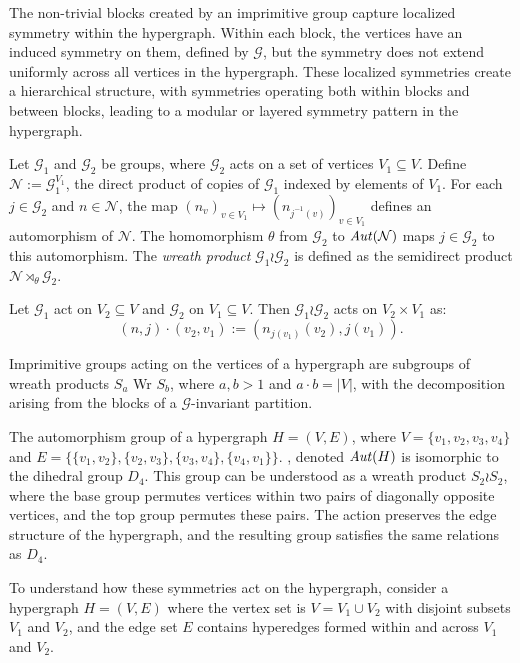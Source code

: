The non-trivial blocks created by an imprimitive group capture localized symmetry within the hypergraph. Within each block, the vertices have an induced symmetry on them, defined by $\mathcal{G}$, but the symmetry does not extend uniformly across all vertices in the hypergraph. These localized symmetries create a hierarchical structure, with symmetries operating both within blocks and between blocks, leading to a modular or layered symmetry pattern in the hypergraph. \cite{BCW24}

\begin{definition}
Let $\mathcal{G}_1$ and $\mathcal{G}_2$ be groups, where $\mathcal{G}_2$ acts on a set of vertices $V_1\subseteq V$. Define $\mathcal{N}:=\mathcal{G}_1^{V_1}$, the direct product of copies of $\mathcal{G}_1$ indexed by elements of $V_1$. For each $j\in\mathcal{G}_2$ and $n\in\mathcal{N}$, the map $(n_v)_{v\in V_1}\mapsto(n_{j^{-1}(v)})_{v\in V_1}$ defines an automorphism of $\mathcal{N}$. The homomorphism $\theta$ from $\mathcal{G}_2$ to $\mathit{Aut}(\mathcal{N})$ maps $j\in\mathcal{G}_2$ to this automorphism. The \emph{wreath product} $\mathcal{G}_1\wr\mathcal{G}_2$ is defined as the semidirect product $\mathcal{N}\rtimes_\theta\mathcal{G}_2$.
\end{definition}

Let $\mathcal{G}_1$ act on $V_2\subseteq V$ and $\mathcal{G}_2$ on $V_1\subseteq V$. Then $\mathcal{G}_1\wr\mathcal{G}_2$ acts on $V_2\times V_1$ as:
\[
(n,j)\cdot(v_2,v_1):=(n_{j(v_1)}(v_2),j(v_1)).
\]

Imprimitive groups acting on the vertices of a hypergraph are subgroups of wreath products $S_a$ Wr $S_b$, where $a,b>1$ and $a\cdot b=|V|$, with the decomposition arising from the blocks of a $\mathcal{G}$-invariant partition. \cite{ACS15}

The automorphism group of a hypergraph $H=(V,E)$, where $V=\{v_1,v_2,v_3,v_4\}$ and $E=\{\{v_1,v_2\},\{v_2,v_3\},\{v_3,v_4\},\{v_4,v_1\}\}$. , denoted $\mathit{Aut}(H)$ is isomorphic to the dihedral group $D_4$. This group can be understood as a wreath product $S_2\wr S_2$, where the base group permutes vertices within two pairs of diagonally opposite vertices, and the top group permutes these pairs. The action preserves the edge structure of the hypergraph, and the resulting group satisfies the same relations as $D_4$.

To understand how these symmetries act on the hypergraph, consider a hypergraph $H=(V,E)$ where the vertex set is $V=V_1\cup V_2$ with disjoint subsets $V_1$ and $V_2$, and the edge set $E$ contains hyperedges formed within and across $V_1$ and $V_2$.

